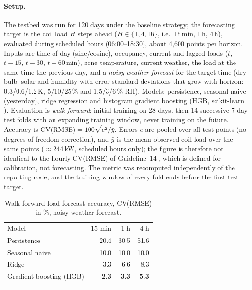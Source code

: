 \documentclass{svproc}
\begin{document}
\paragraph{Setup.} The testbed was run for 120 days under the baseline strategy; the forecasting target is the coil load $H$ steps ahead ($H\in\{1,4,16\}$, i.e.\ 15\,min, 1\,h, 4\,h), evaluated during scheduled hours (06:00--18:30), about 4{,}600 points per horizon. Inputs are time of day (sine/cosine), occupancy, current and lagged loads ($t$, $t{-}15$, $t{-}30$, $t{-}60$\,min), zone temperature, current weather, the load at the same time the previous day, and a \emph{noisy weather forecast} for the target time (dry-bulb, solar and humidity with error standard deviations that grow with horizon: 0.3/0.6/1.2\,K, 5/10/25\,\% and 1.5/3/6\,\% RH). Models: persistence, seasonal-naive (yesterday), ridge regression and histogram gradient boosting (HGB, scikit-learn \cite{pedregosa2011}). Evaluation is \emph{walk-forward}: initial training on 28 days, then 14 successive 7-day test folds with an expanding training window, never training on the future. Accuracy is CV(RMSE)$=100\sqrt{\overline{e^2}}/\bar y$. Errors $e$ are pooled over all test points (no degrees-of-freedom correction), and $\bar y$ is the mean observed coil load over the same points ($\approx 244$\,kW, scheduled hours only); the figure is therefore not identical to the hourly CV(RMSE) of Guideline~14 \cite{ashrae14}, which is defined for calibration, not forecasting. The metric was recomputed independently of the reporting code, and the training window of every fold ends before the first test target.

\begin{table}[t]
\caption{Walk-forward load-forecast accuracy, CV(RMSE) in \%, noisy weather forecast.}
\label{tab:forecast}
\centering
\begin{tabular}{lrrr}
\hline\noalign{\smallskip}
Model & 15 min & 1 h & 4 h \\
\noalign{\smallskip}\hline\noalign{\smallskip}
Persistence & 20.4 & 30.5 & 51.6 \\
Seasonal naive & 10.0 & 10.0 & 10.0 \\
Ridge & 3.3 & 6.6 & 8.3 \\
Gradient boosting (HGB) & \textbf{2.3} & \textbf{3.3} & \textbf{5.3} \\
\noalign{\smallskip}\hline
\end{tabular}
\end{table}
\end{document}
